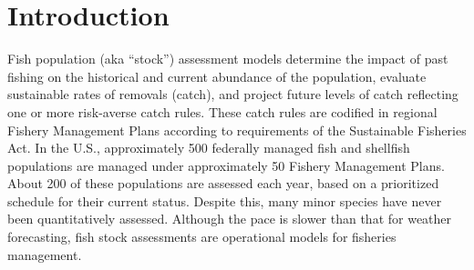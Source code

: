 \section{Introduction}

Fish population (aka ``stock'') assessment models determine the impact of past fishing on the historical and current abundance of the population, evaluate sustainable rates of removals (catch), and project future levels of catch reflecting one or more risk-averse catch rules. These catch rules are codified in regional Fishery Management Plans according to requirements of the Sustainable Fisheries Act. In the U.S., approximately 500 federally managed fish and shellfish populations are managed under approximately 50 Fishery Management Plans. About 200 of these populations are assessed each year, based on a prioritized schedule for their current status. Despite this, many minor species have never been quantitatively assessed. Although the pace is slower than that for weather forecasting, fish stock assessments are operational models for fisheries management.




